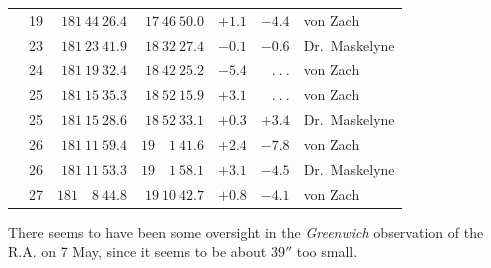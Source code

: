 \begin{center}
{\begin{tabular}{r r|r|r|r|r|l}
&19&$181\ 44\ 26.4$&$17\ 46\ 50.0$&$+1.1$&$-4.4$&von Zach\\
&23&$181\ 23\ 41.9$&$18\ 32\ 27.4$&$-0.1$&$-0.6$&Dr.\ Maskelyne\\
&24&$181\ 19\ 32.4$&$18\ 42\ 25.2$&$-5.4$&$\ .\ .\ .$&von Zach\\
&25&$181\ 15\ 35.3$&$18\ 52\ 15.9$&$+3.1$&$\ .\ .\ .$&von Zach\\
&25&$181\ 15\ 28.6$&$18\ 52\ 33.1$&$+0.3$&$+3.4$&Dr.\ Maskelyne\\
&26&$181\ 11\ 59.4$&$19\quad1\ 41.6$&$+2.4$&$-7.8$&von Zach\\
&26&$181\ 11\ 53.3$&$19\quad1\ 58.1$&$+3.1$&$-4.5$&Dr.\ Maskelyne\\
&27&$181\quad8\ 44.8$&$19\ 10\ 42.7$&$+0.8$&$-4.1$&von Zach
\end{tabular}}
\end{center}
\expandafter\def\csname HistoricalNoteText20\endcsname{There seems to have been some oversight in the \textit{Greenwich} observation of the R.A. on 7 May, since it seems to be about $39''$ too small.}
%
